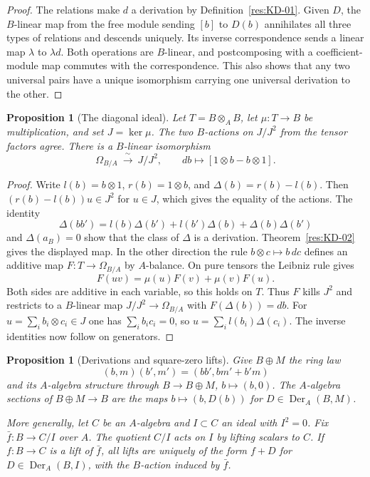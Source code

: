 \documentclass[11pt,oneside,openany]{book}
\newtheorem{proposition}[theorem]{Proposition}
\theoremstyle{definition}
\theoremstyle{remark}
\begin{document}
\begin{proof}
The relations make $d$ a derivation by Definition~\ref{res:KD-01}. Given $D$, the $B$-linear map from the free module sending $[b]$ to $D(b)$ annihilates all three types of relations and descends uniquely. Its inverse correspondence sends a linear map $\lambda$ to $\lambda d$. Both operations are $B$-linear, and postcomposing with a coefficient-module map commutes with the correspondence. This also shows that any two universal pairs have a unique isomorphism carrying one universal derivation to the other.
\end{proof}

\begin{proposition}[The diagonal ideal]\label{res:KD-03}
Let $T=B\otimes_A B$, let $\mu:T\to B$ be multiplication, and set $J=\ker\mu$. The two $B$-actions on $J/J^2$ from the tensor factors agree. There is a $B$-linear isomorphism
\[
 \Omega_{B/A}\ \xrightarrow{\ \sim\ }\ J/J^2,\qquad
 db\longmapsto [1\otimes b-b\otimes1].
\]
\end{proposition}

\begin{proof}
Write $l(b)=b\otimes 1$, $r(b)=1\otimes b$, and $\Delta(b)=r(b)-l(b)$. Then $(r(b)-l(b))u\in J^2$ for $u\in J$, which gives the equality of the actions. The identity
\[
 \Delta(bb')=l(b)\Delta(b')+l(b')\Delta(b)+\Delta(b)\Delta(b')
\]
and $\Delta(a_B)=0$ show that the class of $\Delta$ is a derivation. Theorem~\ref{res:KD-02} gives the displayed map. In the other direction the rule $b\otimes c\mapsto b\,dc$ defines an additive map $F:T\to\Omega_{B/A}$ by $A$-balance. On pure tensors the Leibniz rule gives
\[
 F(uv)=\mu(u)F(v)+\mu(v)F(u).
\]
Both sides are additive in each variable, so this holds on $T$. Thus $F$ kills $J^2$ and restricts to a $B$-linear map $J/J^2\to\Omega_{B/A}$ with $F(\Delta(b))=db$. For $u=\sum_i b_i\otimes c_i\in J$ one has $\sum_i b_ic_i=0$, so $u=\sum_i l(b_i)\Delta(c_i)$. The inverse identities now follow on generators.
\end{proof}

\begin{proposition}[Derivations and square-zero lifts]\label{res:KD-04}
Give $B\oplus M$ the ring law
\[
 (b,m)(b',m')=(bb',bm'+b'm)
\]
and its $A$-algebra structure through $B\to B\oplus M$, $b\mapsto(b,0)$. The $A$-algebra sections of $B\oplus M\to B$ are the maps $b\mapsto (b,D(b))$ for $D\in\operatorname{Der}_A(B,M)$.

More generally, let $C$ be an $A$-algebra and $I\subset C$ an ideal with $I^2=0$. Fix $\bar f:B\to C/I$ over $A$. The quotient $C/I$ acts on $I$ by lifting scalars to $C$. If $f:B\to C$ is a lift of $\bar f$, all lifts are uniquely of the form $f+D$ for $D\in\operatorname{Der}_A(B,I)$, with the $B$-action induced by $\bar f$.
\end{proposition}
\end{document}
